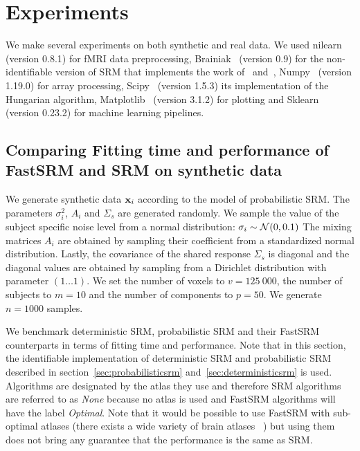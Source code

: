 \documentclass{article}
\newcommand{\bt}[1]{\todo[color=orange, inline=True]{BT: #1}}
\begin{document}
\section{Experiments}
We make several experiments on both synthetic and real data.
%
We used nilearn~\cite{abraham2014machine} (version 0.8.1) for fMRI data preprocessing,
Brainiak~\cite{kumar2020brainiak2} (version 0.9) for the non-identifiable version of SRM that
implements the work of~\cite{chen2015reduced} and~\cite{anderson2016enabling},
Numpy~\cite{harris2020array} (version 1.19.0) for
array processing, Scipy~\cite{2020SciPy-NMeth} (version 1.5.3) its implementation of the
Hungarian algorithm, Matplotlib~\cite{hunter2007matplotlib} (version 3.1.2) for plotting and
Sklearn~\cite{pedregosa2011scikit} (version 0.23.2) for machine learning pipelines.

\subsection{Comparing Fitting time and performance of FastSRM and
  SRM on synthetic data}
We generate synthetic data $\mathbf{x}_i$ according to the model of probabilistic SRM.
%
The parameters $\sigma_i^2$, $A_i$ and $\Sigma_s$ are generated randomly.
%
We sample the value of the subject specific noise level from a normal
distribution: $\sigma_i \sim \mathcal{N}(0, 0.1)$
%
The mixing matrices $A_i$
are obtained by sampling their coefficient from a standardized normal
distribution.
%
Lastly, the covariance of the shared response $\Sigma_s$ is diagonal and the
diagonal values are obtained by sampling from a Dirichlet distribution with
parameter $(1 \dots 1)$.
%
We set the number of voxels to $v=125~000$, the number of subjects to $m=10$ and
the number of components to $p=50$.
%
We generate $n=1000$ samples.
%


We benchmark deterministic SRM, probabilistic SRM and their FastSRM counterparts in terms of fitting time and performance.
%
Note that in this section, the identifiable implementation of deterministic SRM
and probabilistic SRM described in section~\ref{sec:probabilisticsrm}
and~\ref{sec:deterministicsrm} is used. 
%
Algorithms are designated by the atlas they use and therefore SRM algorithms are referred to
as \emph{None} because no atlas is used and FastSRM algorithms will have the
label \emph{Optimal}.
%
Note that it would be possible to use FastSRM with sub-optimal
atlases (there exists a wide variety of brain atlases
~\cite{schaefer2017local, bellec2010multi, mensch2018extracting}) but
using them does not bring any guarantee that the performance is the same as SRM.
%
\end{document}
